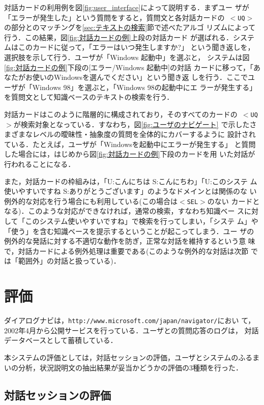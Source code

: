対話カードの利用例を図\ref{fig:user_interface}によって説明する．まずユー
ザが「エラーが発生した」という質問をすると，質問文と各対話カードの{\tt
$<$UQ$>$} の部分とのマッチングを\ref{sec:テキストの検索}節で述べたアルゴ
リズムによって行う．この結果，図\ref{fig:対話カードの例}上段の対話カード
が選ばれる．システムはこのカードに従って，「エラーはいつ発生しますか?」
という聞き返しを，選択肢を示して行う．ユーザが「Windows 起動中」を選ぶと，
システムは図\ref{fig:対話カードの例}下段の[エラー/Windows 起動中]の対話
カードに移って，「あなたがお使いのWindowsを選んでください」という聞き返
しを行う．ここでユーザが「Windows 98」を選ぶと，「Windows 98の起動中にエ
ラーが発生する」を質問文として知識ベースのテキストの検索を行う．


対話カードはこのように階層的に構成されており，そのすべてのカードの{\tt
$<$UQ$>$}が検索対象となっている．すなわち，図\ref{fig:ユーザのナビゲート} 
で示したさまざまなレベルの曖昧性・抽象度の質問を全体的にカバーするように
設計されている．たとえば，ユーザが「Windowsを起動中にエラーが発生する」
と質問した場合には，はじめから図\ref{fig:対話カードの例}下段のカードを用
いた対話が行われることになる．

また，対話カードの枠組みは，「U:こんにちは S:こんにちわ」「U:このシステ
ム使いやすいですね S:ありがとうございます」のようなドメインとは関係のな
い例外的な対応を行う場合にも利用している(この場合は{\tt $<$SEL$>$}のない
カードとなる)．このような対応ができなければ，通常の検索，すなわち知識ベー
スに対して「このシステム使いやすいですね」で検索を行ってしまい，「システ
ム」や「使う」を含む知識ベースを提示するということが起こってしまう．ユー
ザの例外的な発話に対する不適切な動作を防ぎ，正常な対話を維持するという意
味で，対話カードによる例外処理は重要である(このような例外的な対話は次節
では「範囲外」の対話と扱っている)．


\section{評価} \label{sec:評価}

ダイアログナビは，{\tt http://www.microsoft.com/japan/navigator/}におい
て，2002年4月から公開サービスを行っている．ユーザとの質問応答のログは，
対話データベースとして蓄積している．

本システムの評価としては，対話セッションの評価，ユーザとシステムのふるま
いの分析，状況説明文の抽出結果が妥当かどうかの評価の3種類を行った．





\subsection{対話セッションの評価}

